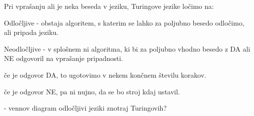 \documentclass[10pt,a4paper,oneside]{book}
\begin{document}
Pri vprašanju ali je neka beseda v jeziku, Turingove jezike ločimo na:
\begin{items}
\item Odločljive - obstaja algoritem, s katerim se lahko za poljubno besedo odločimo, ali pripada jeziku.
\item Neodločljive - v splošnem ni algoritma, ki bi za poljubno vhodno besedo z DA ali NE odgovoril na vprašanje pripadnosti.
	\begin{items}
	\item če je odgovor DA, to ugotovimo v nekem končnem številu korakov.
	\item če je odgovor NE, pa ni nujno, da se bo stroj kdaj ustavil.
	\end{items}
\end{items}



\fixme - vennov diagram odločljivi jeziki znotraj Turingovih?
\end{document}
